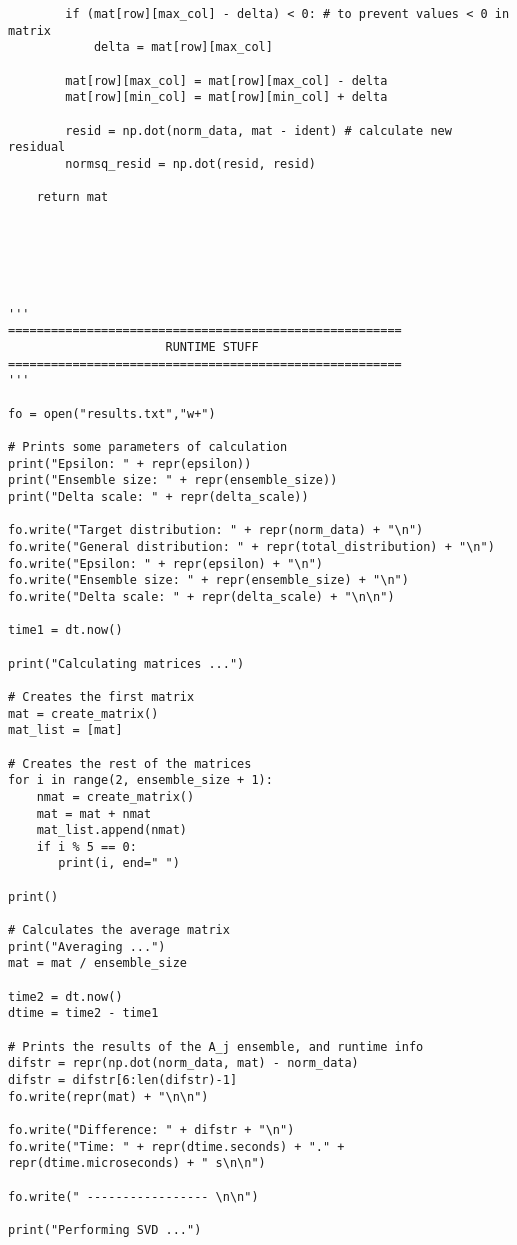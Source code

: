 \documentclass[letterpaper,12pt]{article}
\begin{document}
\begin{verbatim}
        if (mat[row][max_col] - delta) < 0: # to prevent values < 0 in matrix
            delta = mat[row][max_col]       

        mat[row][max_col] = mat[row][max_col] - delta
        mat[row][min_col] = mat[row][min_col] + delta

        resid = np.dot(norm_data, mat - ident) # calculate new residual
        normsq_resid = np.dot(resid, resid)

    return mat






'''
=======================================================
                      RUNTIME STUFF
=======================================================
'''

fo = open("results.txt","w+")

# Prints some parameters of calculation
print("Epsilon: " + repr(epsilon))
print("Ensemble size: " + repr(ensemble_size))
print("Delta scale: " + repr(delta_scale))

fo.write("Target distribution: " + repr(norm_data) + "\n")
fo.write("General distribution: " + repr(total_distribution) + "\n")
fo.write("Epsilon: " + repr(epsilon) + "\n")
fo.write("Ensemble size: " + repr(ensemble_size) + "\n")
fo.write("Delta scale: " + repr(delta_scale) + "\n\n")

time1 = dt.now()

print("Calculating matrices ...")

# Creates the first matrix
mat = create_matrix()
mat_list = [mat]

# Creates the rest of the matrices
for i in range(2, ensemble_size + 1):
    nmat = create_matrix()
    mat = mat + nmat
    mat_list.append(nmat)
    if i % 5 == 0:
       print(i, end=" ")

print()

# Calculates the average matrix
print("Averaging ...")
mat = mat / ensemble_size

time2 = dt.now()
dtime = time2 - time1

# Prints the results of the A_j ensemble, and runtime info
difstr = repr(np.dot(norm_data, mat) - norm_data)
difstr = difstr[6:len(difstr)-1]
fo.write(repr(mat) + "\n\n")

fo.write("Difference: " + difstr + "\n")
fo.write("Time: " + repr(dtime.seconds) + "." + repr(dtime.microseconds) + " s\n\n")

fo.write(" ----------------- \n\n")

print("Performing SVD ...")


\end{verbatim}
\end{document}
